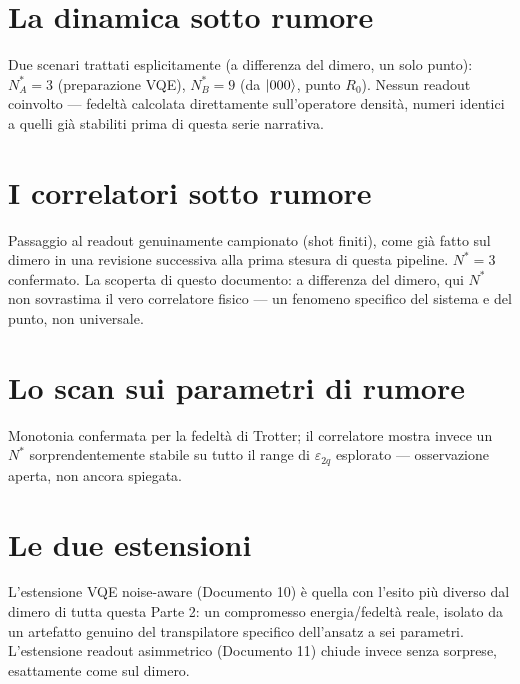 \documentclass[11pt,a4paper]{article}
\begin{document}

\section{La dinamica sotto rumore}

Due scenari trattati esplicitamente (a differenza del dimero, un solo
punto): $N^*_A=3$ (preparazione VQE), $N^*_B=9$ (da $\lvert 000\rangle$, punto
$R_0$). Nessun readout coinvolto --- fedeltà calcolata direttamente
sull'operatore densità, numeri identici a quelli già stabiliti prima di
questa serie narrativa.

\section{I correlatori sotto rumore}

Passaggio al readout genuinamente campionato (shot finiti), come già
fatto sul dimero in una revisione successiva alla prima stesura di questa
pipeline. $N^*=3$ confermato. La scoperta di questo documento: a
differenza del dimero, qui $N^*$ non sovrastima il vero correlatore
fisico --- un fenomeno specifico del sistema e del punto, non universale.

\section{Lo scan sui parametri di rumore}

Monotonia confermata per la fedeltà di Trotter; il correlatore mostra
invece un $N^*$ sorprendentemente stabile su tutto il range di
$\varepsilon_{2q}$ esplorato --- osservazione aperta, non ancora spiegata.

\section{Le due estensioni}

L'estensione VQE noise-aware (Documento 10) è quella con l'esito più
diverso dal dimero di tutta questa Parte 2: un compromesso energia/fedeltà
reale, isolato da un artefatto genuino del transpilatore specifico
dell'ansatz a sei parametri. L'estensione readout asimmetrico (Documento
11) chiude invece senza sorprese, esattamente come sul dimero.

\end{document}
